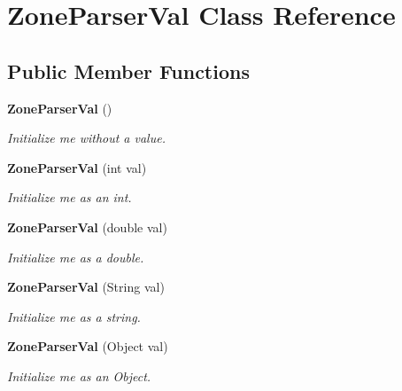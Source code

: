 \section{Zone\+Parser\+Val Class Reference}
\label{classorg_1_1smallfoot_1_1parser_1_1zone_1_1ZoneParserVal}
\subsection*{Public Member Functions}
\begin{DoxyCompactItemize}
\item 
{\bf Zone\+Parser\+Val} ()
\begin{DoxyCompactList}\small\item\em Initialize me without a value. \end{DoxyCompactList}\item 
{\bf Zone\+Parser\+Val} (int val)
\begin{DoxyCompactList}\small\item\em Initialize me as an int. \end{DoxyCompactList}\item 
{\bf Zone\+Parser\+Val} (double val)
\begin{DoxyCompactList}\small\item\em Initialize me as a double. \end{DoxyCompactList}\item 
{\bf Zone\+Parser\+Val} (String val)
\begin{DoxyCompactList}\small\item\em Initialize me as a string. \end{DoxyCompactList}\item 
{\bf Zone\+Parser\+Val} (Object val)
\begin{DoxyCompactList}\small\item\em Initialize me as an Object. \end{DoxyCompactList}\end{DoxyCompactItemize}

